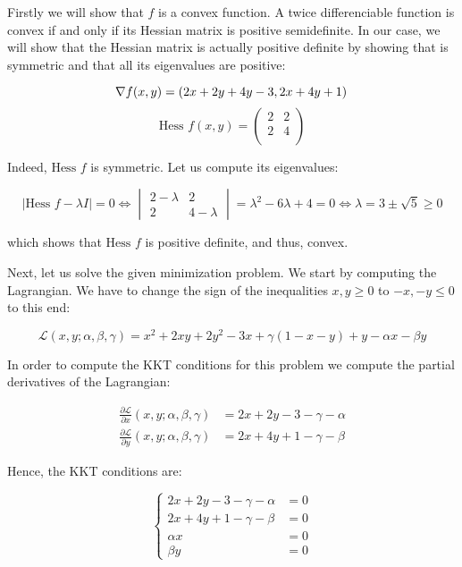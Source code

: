 \documentclass[11pt,table]{article}
\begin{document}
	Firstly we will show that \(f\) is a convex function. A twice differenciable function is convex if and only if its Hessian matrix is positive semidefinite. In our case, we will show that the Hessian matrix is actually positive definite by showing that is symmetric and that all its eigenvalues are positive:
	
	\[
	\nabla f(x,y) = \left( 2x + 2y + 4y -3, 2x +4y +1 \right) \\
	\]
	\[
	\text{Hess } f(x,y) = \begin{pmatrix}
		2 & 2 \\
		2 & 4 \\
	\end{pmatrix}
	\]
	
	Indeed, \(\text{Hess } f\) is symmetric. Let us compute its eigenvalues:
	
	\[
	|\text{Hess }f - \lambda I| = 0 \Longleftrightarrow 
	\begin{vmatrix}
		2 - \lambda & 2 \\
		2 & 4 - \lambda
	\end{vmatrix} = \lambda^2 -6\lambda + 4 = 0 \Longleftrightarrow \lambda = 3 \pm \sqrt 5 \ge 0
	\]
	
	which shows that \(\text{Hess }f\) is positive definite, and thus, convex.
	
	Next, let us solve the given minimization problem. We start by computing the Lagrangian. We have to change the sign of the inequalities \(x,y \ge 0\) to \(-x,-y \le 0\) to this end:
	
	\[
	\mathcal L(x,y; \alpha, \beta, \gamma) = x^2 + 2xy + 2y^2 - 3x + \gamma(1 - x - y) + y -\alpha x - \beta y
	\]
	
	In order to compute the KKT conditions for this problem we compute the partial derivatives of the Lagrangian:
	
	\begin{align*}
		\frac{\partial \mathcal L}{\partial x}(x,y; \alpha, \beta, \gamma) & = 2x + 2y -3 - \gamma - \alpha \\
		\frac{\partial \mathcal L}{\partial y}(x,y; \alpha, \beta, \gamma) & = 2x + 4y + 1 - \gamma - \beta
	\end{align*}
	
	Hence, the KKT conditions are:
	
	\[
	\begin{cases}
		2x + 2y -3 - \gamma - \alpha & = 0 \\
		2x + 4y + 1 - \gamma - \beta & = 0 \\
		\alpha x & = 0 \\
		\beta y & = 0
	\end{cases}
	\]
	
\end{document}
